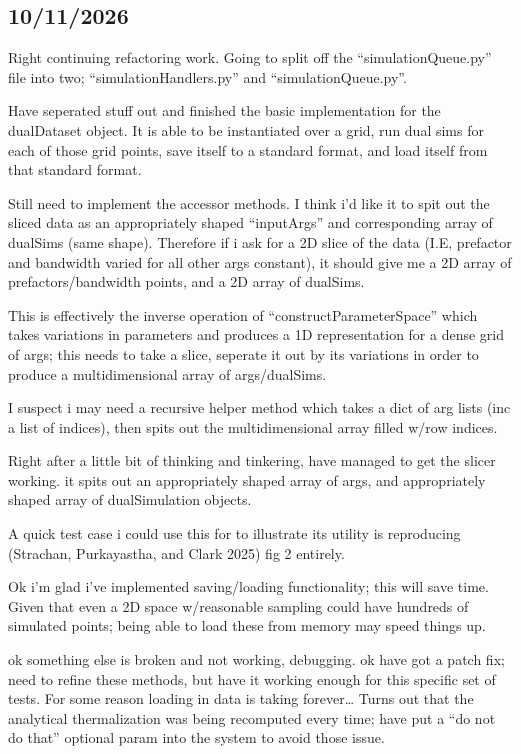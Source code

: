 \documentclass[
  letterpaper,
  DIV=11,
  numbers=noendperiod]{scrartcl}
\author{}
\date{}
\begin{document}
\subsection{10/11/2026}\label{section}

Right continuing refactoring work. Going to split off the
``simulationQueue.py'' file into two; ``simulationHandlers.py'' and
``simulationQueue.py''.

Have seperated stuff out and finished the basic implementation for the
dualDataset object. It is able to be instantiated over a grid, run dual
sims for each of those grid points, save itself to a standard format,
and load itself from that standard format.

Still need to implement the accessor methods. I think i'd like it to
spit out the sliced data as an appropriately shaped ``inputArgs'' and
corresponding array of dualSims (same shape). Therefore if i ask for a
2D slice of the data (I.E, prefactor and bandwidth varied for all other
args constant), it should give me a 2D array of prefactors/bandwidth
points, and a 2D array of dualSims.

This is effectively the inverse operation of ``constructParameterSpace''
which takes variations in parameters and produces a 1D representation
for a dense grid of args; this needs to take a slice, seperate it out by
its variations in order to produce a multidimensional array of
args/dualSims.

I suspect i may need a recursive helper method which takes a dict of arg
lists (inc a list of indices), then spits out the multidimensional array
filled w/row indices.

Right after a little bit of thinking and tinkering, have managed to get
the slicer working. it spits out an appropriately shaped array of args,
and appropriately shaped array of dualSimulation objects.

A quick test case i could use this for to illustrate its utility is
reproducing (Strachan, Purkayastha, and Clark 2025) fig 2 entirely.

Ok i'm glad i've implemented saving/loading functionality; this will
save time. Given that even a 2D space w/reasonable sampling could have
hundreds of simulated points; being able to load these from memory may
speed things up.

ok something else is broken and not working, debugging. ok have got a
patch fix; need to refine these methods, but have it working enough for
this specific set of tests. For some reason loading in data is taking
forever\ldots{} Turns out that the analytical thermalization was being
recomputed every time; have put a ``do not do that'' optional param into
the system to avoid those issue.
\end{document}
